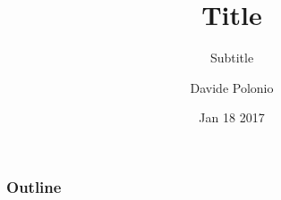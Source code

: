 \documentclass{beamer}
\title{Title}
\subtitle{\newline Subtitle}
\author{Davide Polonio}
\date{Jan 18 2017}
\institute{University of Padova}
\begin{document}
\newcommand{\turnOffNumbers}{true}
\begin{frame}[noframenumbering]
\titlepage
\end{frame}
\let\turnOffNumbers\empty
\begin{frame}
	\frametitle{Outline}
	\tableofcontents
\end{frame}

%

\makethanks
\end{document}
